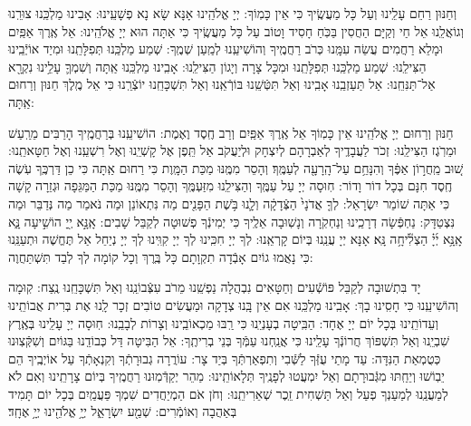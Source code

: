 \documentclass[twoside, openany, parskip=half, 11pt]{book}
\begin{document}
 וְחַנּוּן רַחֵם עָלֵֽינוּ וְעַל כָּל מַעֲשֶֽׂיךָ כִּי אֵין כָּמֽוֹךָ: יְיָ אֱלֹהֵֽינוּ אָנָּא שָׂא נָא פְשָׁעֵֽינוּ: אָבִינוּ מַלְכֵּֽנוּ צוּרֵֽנוּ וְגוֹאֲלֵֽנוּ אֵל חַי וְקַיָּם הַחֲסִין בַּכֹּֽחַ חָסִיד וָטוֹב עַל כָּל מַעֲשֶֽׂיךָ כִּי אַתָּה הוּא יְיָ אֱלֹהֵֽינוּ: אֵל אֶֽרֶךְ אַפַּֽיִם וּמָלֵא רַחֲמִים עֲשֵׂה עִמָּֽנוּ כְּרֹב רַחֲמֶֽיךָ וְהוֹשִׁיעֵֽנוּ לְמַֽעַן שְׁמֶֽךָ: שְׁמַע מַלְכֵּֽנוּ תְּפִלָּתֵֽנוּ וּמִיַד אוֹיְֿבֵֽינוּ הַצִּילֵֽנוּ: שְׁמַע מַלְכֵּֽנוּ תְּפִלָּתֵֽנוּ וּמִכָּל צָרָה וְיָגוֹן הַצִּילֵֽנוּ: אָבִֽינוּ מַלְכֵּֽנוּ אַֽתָּה 
וְשִׁמְךָ֛ עָלֵ֥ינוּ נִקְרָ֖א אַל־תַּנִּחֵֽנוּ: אַל תַּעַזְבֵֽנוּ אָבִֽינוּ וְאַל תִּטְּֿשֵֽׁנוּ בּוֹרְֿאֵֽנוּ וְאַל תִּשְׁכָּחֵֽנוּ יוֹצְֿרֵֽנוּ כִּי אֵל מֶֽלֶךְ חַנּוּן וְרַחוּם אַֽתָּה:



 חַנּוּן וְרַחוּם יְיָ אֱלֹהֵֽינוּ אֵין כָּמֽוֹךָ אֵל אֶֽרֶךְ אַפַּֽיִם וְרַב חֶֽסֶד וֶאֶמֶת: הוֹשִׁיעֵֽנוּ בְּרַחֲמֶֽיךָ הָרַבִּים מֵרַֽעַשׁ וּמֵרֹֽגֶז הַצִּילֵֽנוּ: זְכֹר לַעֲבָדֶֽיךָ לְאַבְרָהָם לְיִצְחָק וּלְיַעֲקֹב אַל תֵּֽפֶן אֶל קָשְׁיֵֽנוּ וְאֶל רִשְׁעֵֽנוּ וְאֶל חַטָּאתֵֽנוּ: 
 שׁ֚וּב מֵֽחֲר֣וֹן אַפֶּ֔ךָ וְהִנָּחֵ֥ם עַל־הָֽרָעָ֖ה לְעַמֶּֽךָ׃ וְהָסֵר מִמֶּֽנּוּ מַכַּת הַמָּֽוֶת כִּי רַחוּם אַֽתָּה כִּי כֵן דַּרְכֶּֽךָ עֹֽשֶׂה חֶֽסֶד חִנָּם בְּכָל דוֹר וָדוֹר: חֽוּסָה יְיָ עַל עַמֶּֽךָ וְהַצִּילֵֽנוּ מִזַּעְמֶּֽךָ וְהָסֵר מִמֶּֽנּוּ מַכַּת הַמַּגֵּפָה וּגְזֵרָה קָשָׁה כִּי אַתָּה שׁוֹמֵר יִשְׂרָאֵל:
לְךָ֤ אֲדֹנָי֙ הַצְּֿדָקָ֔ה וְלָ֛נוּ בֹּ֥שֶׁת הַפָּנִ֖ים מַה נִּתְאוֹנֵן וּמַה נֹּאמַר מַה נְּדַבֵּר וּמַה נִּצְטַדָּק: נַחְפְּֿשָׂה דְרָכֵֽינוּ וְנַחְקֹֽרָה וְנָשֽׁוּבָה אֵלֶֽיךָ כִּי יְמִינְֿךָ פְשׁוּטָה לְקַבֵּל שָׁבִים:
אָֽנָּ֣א יְ֖יָ הוֹשִׁ֣יעָה נָּ֑א אָֽנָּ֥א יְ֜יָ֗ הַצְלִ֘יחָ֥ה נָּֽא׃ אָנָּא יְיָ עֲנֵֽנוּ בְּיוֹם קָרְאֵֽנוּ: לְךָ יְיָ חִכִּֽינוּ לְךָ יְיָ קִוִּֽינוּ לְךָ יְיָ נְיַחֵל אַל תֶּחֱשֶׁה וּתְעַנֵּֽנוּ כִּי נָאֲמוּ גוֹיִם אָבְֿדָה תִקְוָתָם כָּל בֶּֽרֶךְ וְכָל קוֹמָה לְךָ לְבַד תִּשְׁתַּחֲוֶה: 
 
 
 יָד בִּתְשׁוּבָה לְקַבֵּל פּוֹשְֿׁעִים וְחַטָּאִים נִבְהֲלָה נַפְשֵֽׁנוּ מֵרֹב עִצְּֿבוֹנֵֽנוּ וְאַל תִּשְׁכָּחֵֽנוּ נֶֽצַח: קֽוּמָה וְהוֹשִׁיעֵֽנוּ כִּי חָסִֽינוּ בָךְ: אָבִֽינוּ מַלְכֵּֽנוּ אִם אֵין בָּֽנוּ צְדָקָה וּמַעֲשִׂים טוֹבִים זְכָר לָֽנוּ אֶת בְּרִית אֲבוֹתֵֽינוּ וְעֵדוֹתֵֽינוּ בְּכָל יוֹם יְיָ אֶחָד: הַבִּֽיטָה בְעָנְיֵֽנוּ כִּי רַֽבּוּ מַכְאוֹבֵֽינוּ וְצָרוֹת לְבָבֵֽנוּ: חֽוּסָה יְיָ עָלֵֽינוּ בְּאֶֽרֶץ שִׁבְיֵֽנוּ וְאַל תִּשְׁפּוֹךְ חֲרוֹנְֿךָ עָלֵֽינוּ כִּי אֲנַֽחְנוּ עַמְּֿךָ בְּנֵי בְרִיתֶֽךָ: אֵל הַבִּיטָה דַּל כְּבוֹדֵֽנוּ בַּגּוֹיִם וְשִׁקְּֿצֽוּנוּ כְּטֻמְאַת הַנִּדָּה: עַד מָתַי עֻזְּֿךָ לַשְּֿׁבִי וְתִפְאַרְתְּֿךָ בְּיַד צָר: עוֹרֲרָה גְבוּרָתְֿךָ וְקִנְאָתְֿךָ עַל אוֹיְבֶֽיךָ הֵם יֵבֽוֹשׁוּ וְיֵחַֽתּוּ מִגְּֿבוּרָתָם וְאַל יִמְעֲטוּ לְפָנֶֽיךָ תְּלָאוֹתֵֽינוּ: מַהֵר יְקַדְּֿמֽוּנוּ רַחֲמֶֽיךָ בְּיוֹם צָרָתֵֽינוּ וְאִם לֹא לְמַעֲנֵֽנוּ לְמַעַנְךָ פְעַל וְאַל תַּשְׁחִית זֵֽכֶר שְׁאֵרִיתֵֽנוּ: וְחֹן אֹם הַמְיַחֲדִים שִׁמְךָ פַּעֲמַֽיִם בְּכָל יוֹם תָּמִיד בְּאַהֲבָה וְאוֹמְֿרִים: 
 שְׁמַ֖ע יִשְׂרָאֵ֑ל יְיָ֥ אֱלֹהֵ֖ינוּ יְיָ֥ אֶחָֽד׃
\end{document}
